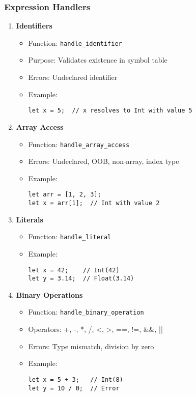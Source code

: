 \documentclass[12pt,a4paper]{article}
\begin{document}
\subsubsection*{Expression Handlers}
\begin{enumerate}
	\item \textbf{Identifiers}
	      \begin{itemize}
		      \item Function: \texttt{handle\_identifier}
		      \item Purpose: Validates existence in symbol table
		      \item Errors: Undeclared identifier
		      \item Example:
		            \begin{lstlisting}
let x = 5;  // x resolves to Int with value 5
        \end{lstlisting}
	      \end{itemize}

	\item \textbf{Array Access}
	      \begin{itemize}
		      \item Function: \texttt{handle\_array\_access}
		      \item Errors: Undeclared, OOB, non-array, index type
		      \item Example:
		            \begin{lstlisting}
let arr = [1, 2, 3];
let x = arr[1];  // Int with value 2
        \end{lstlisting}
	      \end{itemize}

	\item \textbf{Literals}
	      \begin{itemize}
		      \item Function: \texttt{handle\_literal}
		      \item Example:
		            \begin{lstlisting}
let x = 42;    // Int(42)
let y = 3.14;  // Float(3.14)
        \end{lstlisting}
	      \end{itemize}

	\item \textbf{Binary Operations}
	      \begin{itemize}
		      \item Function: \texttt{handle\_binary\_operation}
		      \item Operators: +, -, *, /, <, >, ==, !=, \&\&, ||
		      \item Errors: Type mismatch, division by zero
		      \item Example:
		            \begin{lstlisting}
let x = 5 + 3;   // Int(8)
let y = 10 / 0;  // Error
        \end{lstlisting}
	      \end{itemize}


\end{enumerate}
\end{document}
